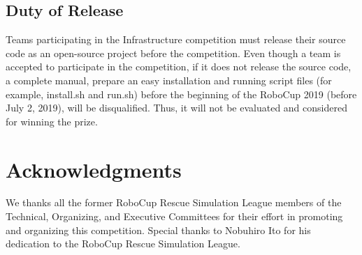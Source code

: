 \documentclass{article}
\begin{document}
\subsection{Duty of Release}
Teams participating in the Infrastructure competition must release their source code as an open-source project before the competition. Even though a team is accepted to participate in the competition, if it does not release the source code, a complete manual, prepare an easy installation and running script files (for example, install.sh and run.sh) before the beginning of the RoboCup 2019 (before July 2, 2019), will be disqualified. Thus, it will not be evaluated and considered for winning the prize.
\section*{Acknowledgments}
We thanks all the former RoboCup Rescue Simulation League members of the Technical, Organizing, and Executive Committees for their effort in promoting and organizing this competition. Special thanks to Nobuhiro Ito for his dedication to the RoboCup Rescue Simulation League.
\end{document}

